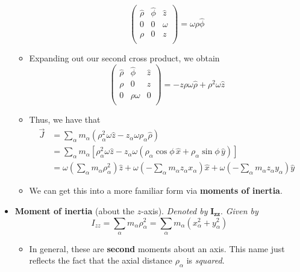 \documentclass[../notes.tex]{subfiles}
\begin{document}
\begin{itemize}
\begin{itemize}
\begin{equation*}
\begin{pmatrix}
                \hat{\rho} & \hat{\phi} & \hat{z}\\
                0 & 0 & \omega\\
                \rho & 0 & z\\
            \end{pmatrix}
            = \omega\rho\hat{\phi}
        \end{equation*}
        \item Expanding out our second cross product, we obtain
        \begin{equation*}
            \begin{pmatrix}
                \hat{\rho} & \hat{\phi} & \hat{z}\\
                \rho & 0 & z\\
                0 & \rho\omega & 0\\
            \end{pmatrix}
            = -z\rho\omega\hat{\rho}+\rho^2\omega\hat{z}
        \end{equation*}
        \item Thus, we have that
        \begin{align*}
            \vec{J} &= \sum_\alpha m_\alpha(\rho_\alpha^2\omega\hat{z}-z_\alpha\omega\rho_\alpha\hat{\rho})\\
            &= \sum_\alpha m_\alpha[\rho_\alpha^2\omega\hat{z}-z_\alpha\omega(\rho_\alpha\cos\phi\,\hat{x}+\rho_\alpha\sin\phi\,\hat{y})]\\
            &= \omega\left( \sum_\alpha m_\alpha\rho_\alpha^2 \right)\hat{z}+\omega\left( -\sum_\alpha m_\alpha z_\alpha x_\alpha \right)\hat{x}+\omega\left( -\sum_\alpha m_\alpha z_\alpha y_\alpha \right)\hat{y}
        \end{align*}
        \item We can get this into a more familiar form via \textbf{moments of inertia}.
    \end{itemize}
    \pagebreak
    \item \textbf{Moment of inertia} (about the $z$-axis). \emph{Denoted by} $\bm{I_{zz}}$. \emph{Given by}
    \begin{equation*}
        I_{zz} = \sum_\alpha m_\alpha\rho_\alpha^2
        = \sum_\alpha m_\alpha(x_\alpha^2+y_\alpha^2)
    \end{equation*}
    \begin{itemize}
        \item In general, these are \textbf{second} moments about an axis. This name just reflects the fact that the axial distance $\rho_\alpha$ is \emph{squared}.

\end{itemize}
\end{itemize}
\end{document}

